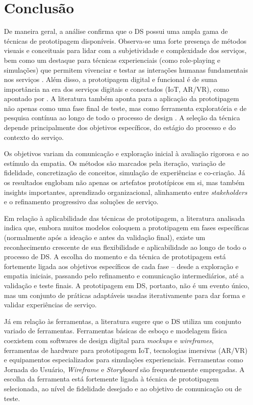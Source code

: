\chapter[Conclusão]{Conclusão}

De maneira geral, a análise confirma que o DS possui uma ampla gama de técnicas de prototipagem disponíveis. Observa-se uma forte presença de métodos visuais e conceituais para lidar com a subjetividade e complexidade dos serviços, bem como um destaque para técnicas experienciais (como role-playing e simulações) que permitem vivenciar e testar as interações humanas fundamentais nos serviços \cite{soto2023prototyping, seko2024transitions}. Além disso, a prototipagem digital e funcional é de suma importância na era dos serviços digitais e conectados (IoT, AR/VR), como apontado por . A literatura também aponta para a aplicação da prototipagem não apenas como uma fase final de teste, mas como ferramenta exploratória e de pesquisa contínua ao longo de todo o processo de design \cite{soto2023prototyping, paust2025integrative}. A seleção da técnica depende principalmente dos objetivos específicos, do estágio do processo e do contexto do serviço.

Os objetivos variam da comunicação e exploração inicial à avaliação rigorosa e ao estímulo da empatia. Os métodos são marcados pela iteração, variação de fidelidade, concretização de conceitos, simulação de experiências e co-criação. Já os resultados englobam não apenas os artefatos prototípicos em si, mas também insights importantes, aprendizado organizacional, alinhamento entre \textit{stakeholders} e o refinamento progressivo das soluções de serviço.

Em relação à aplicabilidade das técnicas de prototipagem, a literatura analisada indica que, embora muitos modelos coloquem a prototipagem em fases específicas (normalmente após a ideação e antes da validação final), existe um reconhecimento crescente de sua flexibilidade e aplicabilidade ao longo de todo o processo de DS. A escolha do momento e da técnica de prototipagem está fortemente ligada aos objetivos específicos de cada fase – desde a exploração e empatia iniciais, passando pelo refinamento e comunicação intermediários, até a validação e teste finais. A prototipagem em DS, portanto, não é um evento único, mas um conjunto de práticas adaptáveis usadas iterativamente para dar forma e validar experiências de serviço.

Já em relação às ferramentas, a literatura sugere que o DS utiliza um conjunto variado de ferramentas. Ferramentas básicas de esboço e modelagem física coexistem com softwares de design digital para \textit{mockups} e \textit{wireframes}, ferramentas de hardware para prototipagem IoT, tecnologias imersivas (AR/VR) e equipamentos especializados para simulações experienciais. Ferramentas como Jornada do Usuário, \textit{Wireframe} e \textit{Storyboard} são frequentemente empregadas. A escolha da ferramenta está fortemente ligada à técnica de prototipagem selecionada, ao nível de fidelidade desejado e ao objetivo de comunicação ou de teste.

